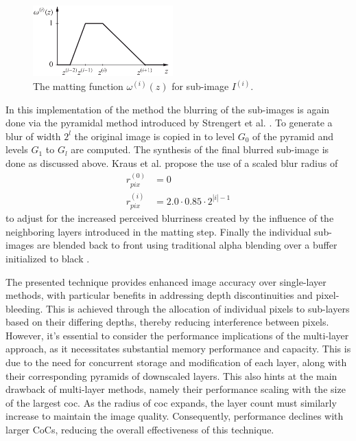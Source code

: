\begin{figure}
\begin{center}
    \includegraphics[width=0.48\textwidth]{images/matt-function.png}
\end{center}
\caption{The matting function $\omega^{(i)}(z)$ for sub-image $I^{(i)}$.\cite{Kraus.2007}}
\label{fig:matt-func}
\end{figure}

In this implementation of the method the blurring of the sub-images is again done via the pyramidal method introduced by Strengert et al. \cite{Strengert.2006}.
To generate a blur of width $2^l$ the original image is copied in to level $G_0$ of the pyramid and levels $G_1$ to $G_l$ are computed.
The synthesis of the final blurred sub-image is done as discussed above.
Kraus et al. propose the use of a scaled blur radius of
\begin{align}
    r^{(0)}_{pix} &= 0 \\
    r^{(i)}_{pix} &= 2.0 \cdot 0.85 \cdot 2^{|i| - 1}
\end{align}
to adjust for the increased perceived blurriness created by the influence of the neighboring layers introduced in the matting step.
Finally the individual sub-images are blended back to front using traditional alpha blending over a buffer initialized to black \cite{Kraus.2007}.

The presented technique provides enhanced image accuracy over single-layer methods, with particular benefits in addressing depth discontinuities and pixel-bleeding.
This is achieved through the allocation of individual pixels to sub-layers based on their differing depths, thereby reducing interference between pixels.
However, it's essential to consider the performance implications of the multi-layer approach, as it necessitates substantial memory performance and capacity.
This is due to the need for concurrent storage and modification of each layer, along with their corresponding pyramids of downscaled layers.
This also hints at the main drawback of multi-layer methods, namely their performance scaling with the size of the largest \gls{coc}.
As the radius of \gls{coc} expands, the layer count must similarly increase to maintain the image quality.
Consequently, performance declines with larger CoCs, reducing the overall effectiveness of this technique.